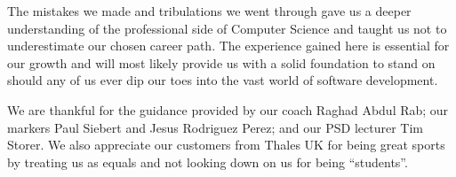 \documentclass{l3proj}
\begin{document}
The mistakes we made and tribulations we went through gave us a deeper understanding of the professional side of Computer Science and taught us not to underestimate our chosen career path. The experience gained here is essential for our growth and will most likely provide us with a solid foundation to stand on should any of us ever dip our toes into the vast world of software development.

We are thankful for the guidance provided by our coach Raghad Abdul Rab; our markers Paul Siebert and Jesus Rodriguez Perez; and our PSD lecturer Tim Storer. We also appreciate our customers from Thales UK for being great sports by treating us as equals and not looking down on us for being “students”.

\newpage



\end{document}
